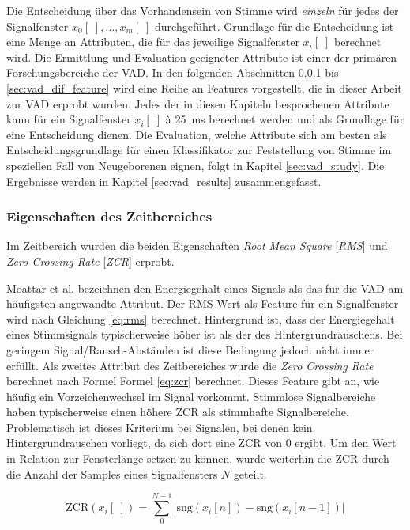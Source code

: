 Die Entscheidung über das Vorhandensein von Stimme wird \emph{einzeln} für jedes der Signalfenster $x_0[\;] , \ldots , x_m[\;]$ durchgeführt. Grundlage für die Entscheidung ist eine Menge an Attributen, die für das jeweilige Signalfenster $x_i[\;]$ berechnet wird. Die Ermittlung und Evaluation geeigneter Attribute ist einer der primären Forschungsbereiche der VAD. In den folgenden Abschnitten \ref{sec:vad_time_features} bis \ref{sec:vad_dif_feature} wird eine Reihe an Features vorgestellt, die in dieser Arbeit zur VAD erprobt wurden. Jedes der in diesen Kapiteln besprochenen Attribute kann für ein Signalfenster $x_i[\;]$ \`{a} \SI{25}{\milli\second} berechnet werden und als Grundlage für eine Entscheidung dienen. Die Evaluation, welche Attribute sich am besten als Entscheidungsgrundlage für einen Klassifikator zur Feststellung von Stimme im speziellen Fall von Neugeborenen eignen, folgt in Kapitel \ref{sec:vad_study}. Die Ergebnisse werden in Kapitel \ref{sec:vad_results} zusammengefasst.

\subsubsection{Eigenschaften des Zeitbereiches}
\label{sec:vad_time_features}

Im Zeitbereich wurden die beiden Eigenschaften \emph{Root Mean Square} [\emph{RMS}] und \emph{Zero Crossing Rate} [\emph{ZCR}] erprobt.

Moattar et al. \cite{vad_Easy} bezeichnen den Energiegehalt eines Signals als das für die VAD am häufigsten angewandte Attribut. Der RMS-Wert als Feature für ein Signalfenster wird nach Gleichung \ref{eq:rms} berechnet. Hintergrund ist, dass der Energiegehalt eines Stimmsignals typischerweise höher ist als der des Hintergrundrauschens. Bei geringem Signal/Rausch-Abständen ist diese Bedingung jedoch nicht immer erfüllt. Als zweites Attribut des Zeitbereiches wurde die \emph{Zero Crossing Rate} berechnet nach Formel Formel \ref{eq:zcr} berechnet. Dieses Feature gibt an, wie häufig ein Vorzeichenwechsel im Signal vorkommt. Stimmlose Signalbereiche haben typischerweise einen höhere ZCR als stimmhafte Signalbereiche. Problematisch ist dieses Kriterium bei Signalen, bei denen kein Hintergrundrauschen vorliegt, da sich dort eine ZCR von 0 ergibt.\cite{vad_ceps} Um den Wert in Relation zur Fensterlänge setzen zu können, wurde weiterhin die ZCR durch die Anzahl der Samples eines Signalfensters $N$ geteilt.

\begin{equation}
\text{ZCR}(x_i[\;]) = \sum_{0}^{N-1}|\text{sng}(x_i[n])-\text{sng}(x_i[n-1])|
\label{eq:zcr}
\end{equation}

